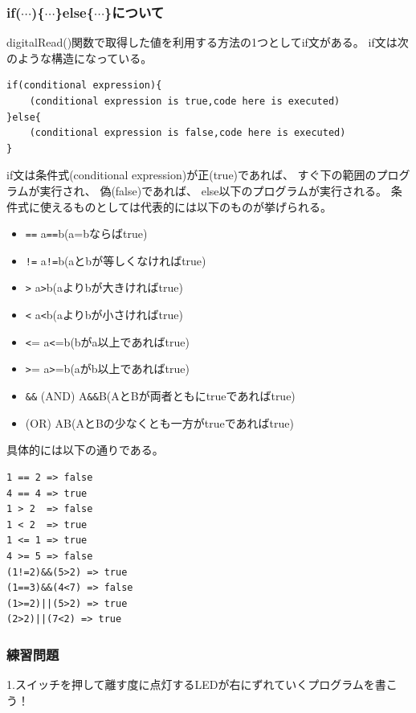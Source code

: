 \documentclass[uplatex]{jsarticle}
\begin{document}
\subsubsection{if($\cdots$)\{$\cdots$\}else\{$\cdots$\}について}
digitalRead()関数で取得した値を利用する方法の1つとしてif文がある。
if文は次のような構造になっている。
\begin{lstlisting}[basicstyle=\ttfamily\footnotesize, frame=single]
if(conditional expression){
    (conditional expression is true,code here is executed)
}else{
    (conditional expression is false,code here is executed)
}
\end{lstlisting}
if文は条件式(conditional expression)が正(true)であれば、
すぐ下の範囲のプログラムが実行され、
偽(false)であれば、
else以下のプログラムが実行される。
条件式に使えるものとしては代表的には以下のものが挙げられる。
\begin{itemize}
    \item \verb|==|  a\verb|==|b(a=bならばtrue)
    \item \verb|!=|  a\verb|!=|b(aとbが等しくなければtrue)
    \item \verb|>|   a\verb|>|b(aよりbが大きければtrue)
    \item \verb|<|   a\verb|<|b(aよりbが小さければtrue)
    \item \verb|<|=  a\verb|<|=b(bがa以上であればtrue)
    \item \verb|>|=  a\verb|>|=b(aがb以上であればtrue)
    \item \verb|&&| (AND) A\verb|&&|B(AとBが両者ともにtrueであればtrue)
    \item \textbar\textbar (OR)  A\textbar\textbar B(AとBの少なくとも一方がtrueであればtrue)
\end{itemize}
具体的には以下の通りである。
\begin{lstlisting}[basicstyle=\ttfamily\footnotesize, frame=single]
1 == 2 => false
4 == 4 => true
1 > 2  => false
1 < 2  => true
1 <= 1 => true
4 >= 5 => false
(1!=2)&&(5>2) => true
(1==3)&&(4<7) => false
(1>=2)||(5>2) => true
(2>2)||(7<2) => true
\end{lstlisting}
\subsubsection{練習問題}
1.スイッチを押して離す度に点灯するLEDが右にずれていくプログラムを書こう！

\clearpage
\end{document}
